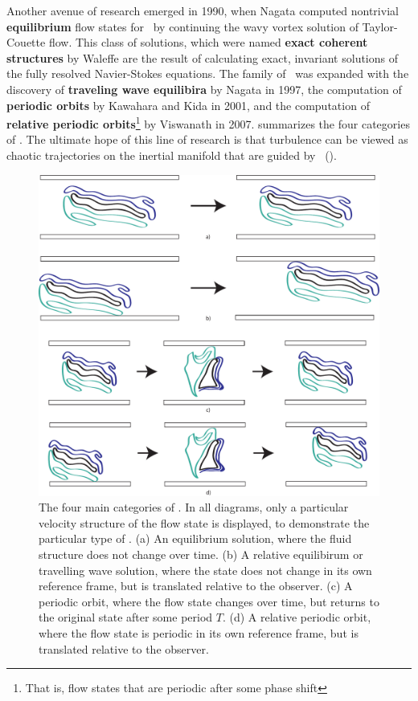 {\begin{figure}[h]
\end{figure}
Another avenue of research emerged in 1990, when Nagata computed nontrivial {\bf equilibrium} flow states for \pCf\ by continuing the wavy vortex solution of Taylor-Couette flow. This class of solutions, which were named {\bf exact coherent structures} by Waleffe are the result of calculating exact, invariant solutions of the fully resolved Navier-Stokes equations. The family of \ecs\ was expanded with the discovery of {\bf traveling wave equilibira} by Nagata in 1997, the computation of {\bf periodic orbits} by Kawahara and Kida in 2001, and the computation of {\bf relative periodic orbits}\footnote{That is, flow states that are periodic after some phase shift} by Viswanath in 2007.  summarizes the four categories of \ecs. The ultimate hope of this line of research is that turbulence can be viewed as chaotic trajectories on the inertial manifold that are guided by \ecs~(). \\
\begin{figure}[ht!]
\centerline{\includegraphics[scale=0.5]{Figs/ECSClassification}}
\caption{The four main categories of \ecs. In all diagrams, only a particular velocity structure of the flow state is displayed, to demonstrate the particular type of \ecs. (a) An {equilibrium} solution, where the fluid structure does not change over time. (b) A {relative equilibirum} or {travelling wave} solution, where the state does not change in its own reference frame, but is translated relative to the observer. (c) A {periodic orbit}, where the flow state changes over time, but returns to the original state after some period $T$. (d) A {relative periodic orbit}, where the flow state is periodic in its own reference frame, but is translated relative to the observer.}\label{fig:ECS}
\end{figure}


}
